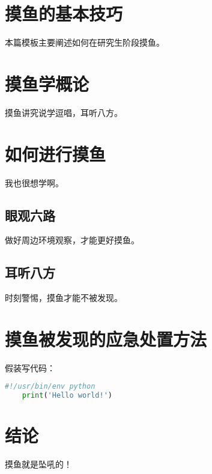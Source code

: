 \section*{摸鱼的基本技巧}
本篇模板主要阐述如何在研究生阶段摸鱼。


\section{摸鱼学概论}
摸鱼讲究说学逗唱，耳听八方。\cite{park1975entrapment}
    
\section{如何进行摸鱼}
我也很想学啊。

\subsection{眼观六路}
做好周边环境观察，才能更好摸鱼。

\subsection{耳听八方}
时刻警惕，摸鱼才能不被发现。

\section{摸鱼被发现的应急处置方法}

假装写代码：

\begin{lstlisting}[language=python] 
    #!/usr/bin/env python
    print('Hello world!')
\end{lstlisting}


\section{结论}
摸鱼就是坠吼的！
	
\newpage